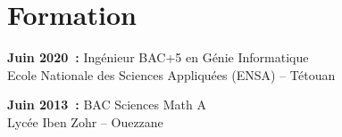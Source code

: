 \section*{Formation}

\noindent\textbf{Juin 2020~:} Ingénieur BAC+5 en Génie Informatique\\
Ecole Nationale des Sciences Appliquées (ENSA) -- Tétouan

\vspace{4pt}
\noindent\textbf{Juin 2013~:} BAC Sciences Math A\\
Lycée Iben Zohr -- Ouezzane
